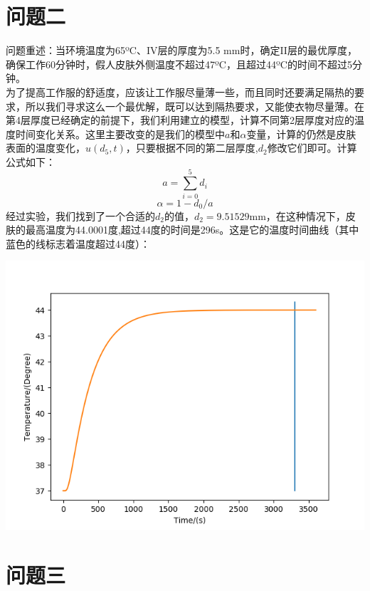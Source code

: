 \documentclass[bwprint]{cumcmthesis}
\begin{document}
\section{问题二}
\indent 问题重述：当环境温度为65ºC、IV层的厚度为5.5 mm时，确定II层的最优厚度，确保工作60分钟时，假人皮肤外侧温度不超过47ºC，且超过44ºC的时间不超过5分钟。\\
\indent 为了提高工作服的舒适度，应该让工作服尽量薄一些，而且同时还要满足隔热的要求，所以我们寻求这么一个最优解，既可以达到隔热要求，又能使衣物尽量薄。在第4层厚度已经确定的前提下，我们利用建立的模型，计算不同第2层厚度对应的温度时间变化关系。这里主要改变的是我们的模型中$a$和$\alpha$变量，计算的仍然是皮肤表面的温度变化，$u(d_5,t)$，只要根据不同的第二层厚度,$d_2$修改它们即可。计算公式如下：
\begin{equation}
    a = \sum_{i=0}^5 d_i
\end{equation}
\begin{equation}
    \alpha = 1-d_0/a
\end{equation}
\indent 经过实验，我们找到了一个合适的$d_2$的值，$d_2=9.51529$mm，在这种情况下，皮肤的最高温度为44.0001度,超过44度的时间是296s。这是它的温度时间曲线（其中蓝色的线标志着温度超过44度）：
\begin{flushleft}
    \includegraphics[scale=1]{Problem2.png}
\end{flushleft}

\section{问题三}
\end{document}

